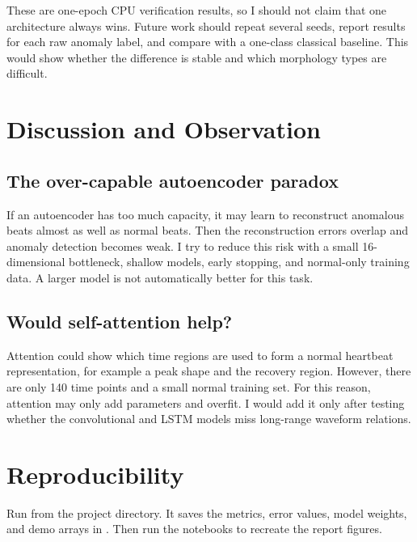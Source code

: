 \documentclass[11pt,a4paper]{article}
\begin{document}
These are one-epoch CPU verification results, so I should not claim that one architecture always wins. Future work should repeat several seeds, report results for each raw anomaly label, and compare with a one-class classical baseline. This would show whether the difference is stable and which morphology types are difficult.

\section{Discussion and Observation}
\subsection*{The over-capable autoencoder paradox}
If an autoencoder has too much capacity, it may learn to reconstruct anomalous beats almost as well as normal beats. Then the reconstruction errors overlap and anomaly detection becomes weak. I try to reduce this risk with a small 16-dimensional bottleneck, shallow models, early stopping, and normal-only training data. A larger model is not automatically better for this task.

\subsection*{Would self-attention help?}
Attention could show which time regions are used to form a normal heartbeat representation, for example a peak shape and the recovery region. However, there are only 140 time points and a small normal training set. For this reason, attention may only add parameters and overfit. I would add it only after testing whether the convolutional and LSTM models miss long-range waveform relations.

\section{Reproducibility}
Run  from the project directory. It saves the metrics, error values, model weights, and demo arrays in . Then run the notebooks to recreate the report figures.
\end{document}
